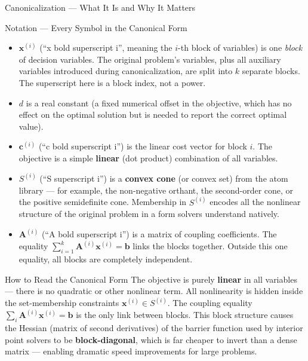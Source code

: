 \documentclass[aspectratio=169,10pt]{beamer}
\begin{document}
\begin{frame}[allowframebreaks]{Canonicalization --- What It Is and Why It Matters}
  \begin{block}{Notation --- Every Symbol in the Canonical Form}
    \begin{itemize}
      \item $\mathbf{x}^{(i)}$ (``x bold superscript i'', meaning the
            $i$-th block of variables) is one \emph{block} of decision
            variables.  The original problem's variables, plus all
            auxiliary variables introduced during canonicalization, are
            split into $k$ separate blocks.  The superscript here is a
            block index, not a power.
      \item $d$ is a real constant (a fixed numerical offset in the
            objective, which has no effect on the optimal solution but
            is needed to report the correct optimal value).
      \item $\mathbf{c}^{(i)}$ (``c bold superscript i'') is the linear
            cost vector for block $i$.  The objective is a simple
            \textbf{linear} (dot product) combination of all variables.
      \item $S^{(i)}$ (``S superscript i'') is a \textbf{convex cone}
            (or convex set) from the atom library --- for example, the
            non-negative orthant, the second-order cone, or the
            positive semidefinite cone.  Membership in $S^{(i)}$
            encodes all the nonlinear structure of the original problem
            in a form solvers understand natively.
      \item $\mathbf{A}^{(i)}$ (``A bold superscript i'') is a matrix
            of coupling coefficients.  The equality
            $\sum_{i=1}^k \mathbf{A}^{(i)}\mathbf{x}^{(i)} = \mathbf{b}$
            links the blocks together.  Outside this one equality, all
            blocks are completely independent.
    \end{itemize}
  \end{block}

  \begin{alertblock}{How to Read the Canonical Form}
    The objective is purely \textbf{linear} in all variables --- there
    is no quadratic or other nonlinear term.  All nonlinearity is hidden
    inside the set-membership constraints $\mathbf{x}^{(i)} \in
    S^{(i)}$.  The coupling equality
    $\sum_i \mathbf{A}^{(i)}\mathbf{x}^{(i)} = \mathbf{b}$ is the
    only link between blocks.  This block structure causes the
    Hessian (matrix of second derivatives) of the barrier function used
    by interior point solvers to be \textbf{block-diagonal}, which is
    far cheaper to invert than a dense matrix --- enabling dramatic
    speed improvements for large problems.
  \end{alertblock}


\end{frame}
\end{document}
